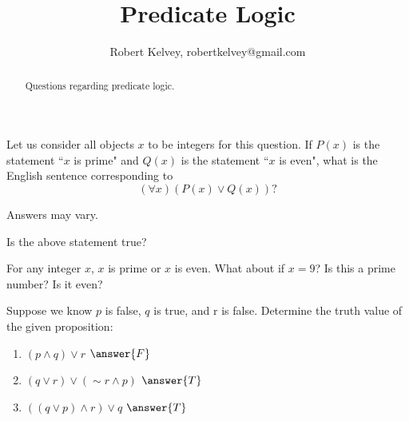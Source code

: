 \documentclass{ximera}
\title{Predicate Logic}
\author{Robert Kelvey, robertkelvey@gmail.com}
\begin{document}
    \begin{abstract}
        Questions regarding predicate logic.
    \end{abstract}
\maketitle

\begin{question}
    Let us consider all objects $x$ to be integers for this question. If $P(x)$ is the statement ``$x$ is prime" and $Q(x)$ is the statement ``$x$ is even", what is the English sentence corresponding to
    \[
        (\forall x)(P(x) \vee Q(x)) ?
    \]
    \begin{freeResponse}
        Answers may vary.
    \end{freeResponse}
           
    
    \begin{question}
        Is the above statement true?
        \begin{multipleChoice}
        \end{multipleChoice}
        \begin{feedback}
            For any integer $x$, $x$ is prime or $x$ is even. What about if $x=9$? Is this a prime number? Is it even?
        \end{feedback}
    \end{question}
    
\end{question}

\begin{question}
    Suppose we know $p$ is false, $q$ is true, and r is false. Determine the truth value of the given proposition:
    \begin{enumerate}
        \item $(p \wedge q) \vee r$ $\answer{F}$
        \item $(q \vee r) \vee ( \sim r \wedge p)$ $\answer{T}$
        \item $((q \vee p) \wedge r) \vee q$ $\answer{T}$
    \end{enumerate}
\end{question}
\end{document}
